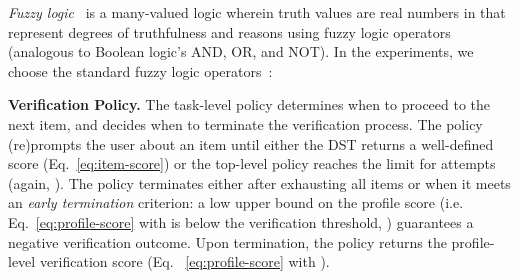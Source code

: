 \documentclass[11pt]{article}
\newcommand{\sparagraph}[1]{\noindent\textbf{#1.}}
\begin{document}
{{\small
}\textit{Fuzzy logic}~\cite{zadeh1996fuzzy}
is a many-valued logic wherein truth values are real numbers in  that represent degrees of truthfulness and reasons using fuzzy logic operators (analogous to Boolean logic's AND, OR, and NOT).
In the experiments, we choose the standard fuzzy logic operators~\cite{zadeh1996fuzzy}:

{\small
}

\sparagraph{Verification Policy}
The task-level policy
determines when to proceed to the next item,
and decides when to terminate the verification process.
The policy
(re)prompts the user about an item
until
either the DST returns a well-defined score (Eq.~\ref{eq:item-score})
or the top-level policy reaches the limit for attempts
(again, ).
The policy terminates
either
after exhausting all items
or when it meets an \textit{early termination} criterion:
a low upper bound on the profile score
(i.e. Eq.~\ref{eq:profile-score} with  is below the verification threshold, )
guarantees a negative verification outcome.
Upon termination, the policy returns the profile-level verification score (Eq. ~\ref{eq:profile-score} with ).




}
\end{document}
